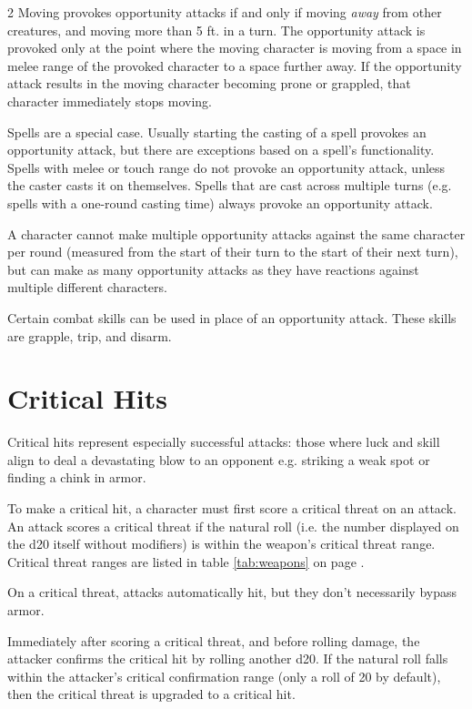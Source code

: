 \begin{multicols*}{2}
    Moving provokes opportunity attacks if and only if moving \textit{away}
    from other creatures, and moving more than 5 ft. in a turn. The opportunity
    attack is provoked only at the point where the moving character is moving
    from a space in melee range of the provoked character to a space further
    away. If the opportunity attack
    results in the moving character becoming prone or grappled, that character
    immediately stops moving.
    
    Spells are a special case. Usually starting the casting of a spell
    provokes an opportunity attack, but there are exceptions based on a
    spell's functionality. Spells with melee or touch range do not
    provoke an opportunity attack, unless the caster casts it on
    themselves. Spells that are cast across multiple turns (e.g. spells
    with a one-round casting time) always provoke an opportunity
    attack.

    A character cannot make multiple opportunity attacks against the same
    character per round (measured from the start of their turn to the start
    of their next turn), but can make as many opportunity attacks as they have
    reactions against multiple different characters.

    Certain combat skills can be used in place of an opportunity attack. These
    skills are grapple, trip, and disarm.

    \section{Critical Hits}\label{combat:critical-hits}
    Critical hits represent especially successful attacks: those where luck and
    skill align to deal a devastating blow to an opponent e.g. striking a weak
    spot or finding a chink in armor.

    To make a critical hit, a character must first score a critical
    threat on an attack. An attack scores a critical
    threat if the natural roll (i.e. the number displayed on the d20 itself
    without modifiers) is within the weapon's critical threat
    range. Critical threat ranges are listed in
    table \ref{tab:weapons} on page \pageref{tab:weapons}.

    On a critical threat, attacks automatically hit, but they don't necessarily
    bypass armor.

    Immediately after scoring a critical threat, and before rolling damage, the
    attacker confirms the critical hit by rolling
    another d20. If the natural roll falls within the attacker's critical
    confirmation range (only a roll
    of 20 by default), then the critical threat is upgraded to a critical hit.


\end{multicols*}
